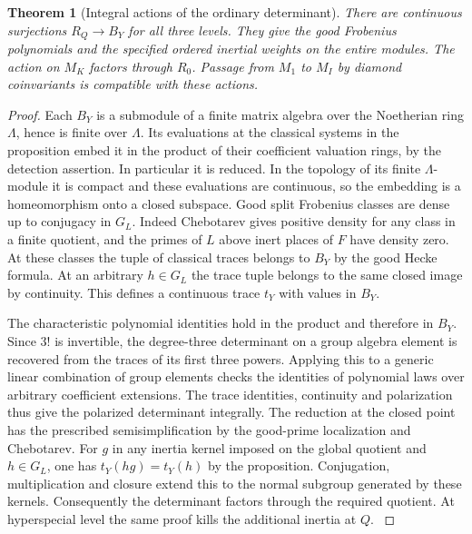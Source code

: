 \documentclass[a4paper,11pt]{article}
\newtheorem{theorem}[proposition]{Theorem}
\theoremstyle{definition}
\theoremstyle{remark}
\numberwithin{equation}{section}
\begin{document}
\begin{theorem}[Integral actions of the ordinary determinant]\leavevmode
\label{thm:alllevels405}
There are continuous surjections \(R_Q\to B_Y\) for all
three levels. They give the good Frobenius polynomials and
the specified ordered inertial weights on the entire modules.
The action on \(M_K\) factors through \(R_0\). Passage
from \(M_1\) to \(M_I\) by diamond coinvariants is compatible
with these actions.
\end{theorem}
\begin{proof}
Each \(B_Y\) is a submodule of a finite matrix algebra over
the Noetherian ring \(\Lambda\), hence is finite over
\(\Lambda\). Its evaluations at the classical systems in
the proposition embed it in the product of their coefficient
valuation rings, by the detection assertion. In particular
it is reduced. In the topology of its finite \(\Lambda\)-module
it is compact and these evaluations are continuous, so the
embedding is a homeomorphism onto a closed subspace.
Good split Frobenius classes are dense up to conjugacy in
\(G_L\). Indeed Chebotarev gives positive density for any
class in a finite quotient, and the primes of \(L\) above
inert places of \(F\) have density zero. At these classes
the tuple of classical traces belongs to \(B_Y\) by the good
Hecke formula. At an arbitrary \(h\in G_L\) the trace tuple
belongs to the same closed image by continuity. This defines
a continuous trace \(t_Y\) with values in \(B_Y\).

The characteristic polynomial identities hold in the product
and therefore in \(B_Y\). Since \(3!\) is invertible, the
degree-three determinant on a group algebra element is recovered
from the traces of its first three powers. Applying this to
a generic linear combination of group elements checks the
identities of polynomial laws over arbitrary coefficient
extensions. The trace identities, continuity and polarization
thus give the polarized determinant integrally.
The reduction at the closed point has the prescribed
semisimplification by the good-prime localization and
Chebotarev. For \(g\) in any inertia kernel imposed on the
global quotient and \(h\in G_L\), one has \(t_Y(hg)=t_Y(h)\)
by the proposition. Conjugation, multiplication and closure
extend this to the normal subgroup generated by these kernels.
Consequently the determinant factors through the required
quotient. At hyperspecial level the same proof kills the
additional inertia at \(Q\). \cite{VIII-VI-chenevier364}


\end{proof}
\end{document}
